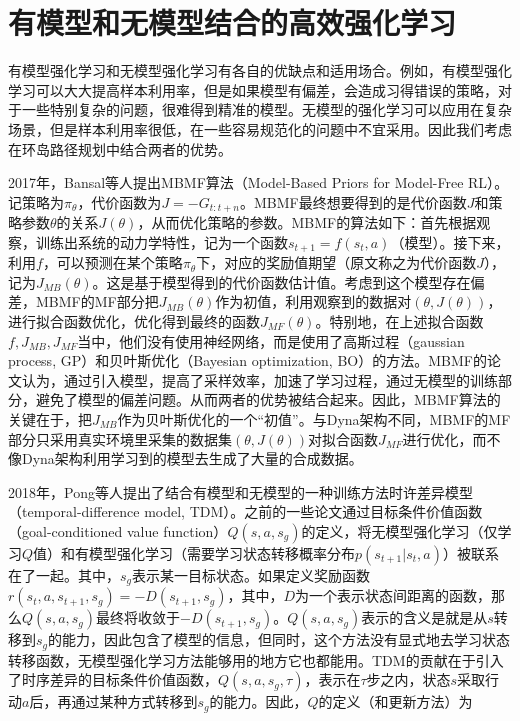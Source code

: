   \section{有模型和无模型结合的高效强化学习}
    有模型强化学习和无模型强化学习有各自的优缺点和适用场合。例如，有模型强化学习可以大大提高样本利用率，但是如果模型有偏差，会造成习得错误的策略，对于一些特别复杂的问题，很难得到精准的模型。无模型的强化学习可以应用在复杂场景，但是样本利用率很低，在一些容易规范化的问题中不宜采用。因此我们考虑在环岛路径规划中结合两者的优势。\par
    2017年，Bansal等人提出MBMF算法（Model-Based Priors for Model-Free RL）\cite{MBMF}。记策略为$\pi_\theta$，代价函数为$J = -G_{t:t+n}$。MBMF最终想要得到的是代价函数$J$和策略参数$\theta$的关系$J(\theta)$，从而优化策略的参数。MBMF的算法如下：首先根据观察，训练出系统的动力学特性，记为一个函数$s_{t+1} = f(s_t, a)$（模型）。接下来，利用$f$，可以预测在某个策略$\pi_\theta$下，对应的奖励值期望（原文称之为代价函数$J$），记为$J_{MB}(\theta)$。这是基于模型得到的代价函数估计值。考虑到这个模型存在偏差，MBMF的MF部分把$J_{MB}(\theta)$作为初值，利用观察到的数据对$(\theta, J(\theta))$，进行拟合函数优化，优化得到最终的函数$J_{MF}(\theta)$。特别地，在上述拟合函数$f, J_{MB}, J_{MF}$当中，他们没有使用神经网络，而是使用了高斯过程\cite{Gaussian_process}（gaussian process, GP）和贝叶斯优化\cite{Bayesian_optimization}（Bayesian optimization, BO）的方法。MBMF的论文认为，通过引入模型，提高了采样效率，加速了学习过程，通过无模型的训练部分，避免了模型的偏差问题。从而两者的优势被结合起来。因此，MBMF算法的关键在于，把$J_{MB}$作为贝叶斯优化的一个``初值''。与Dyna架构\cite{Sutton_book}不同，MBMF的MF部分只采用真实环境里采集的数据集$(\theta, J(\theta))$对拟合函数$J_{MF}$进行优化，而不像Dyna架构利用学习到的模型去生成了大量的合成数据。\par
    2018年，Pong等人提出了结合有模型和无模型的一种训练方法时许差异模型（temporal-difference model, TDM）\cite{TDM}。之前的一些论文通过目标条件价值函数（goal-conditioned value function）$Q(s, a, s_g)$的定义，将无模型强化学习（仅学习$Q$值）和有模型强化学习（需要学习状态转移概率分布$p(s_{t+1}|s_t, a)$）被联系在了一起。其中，$s_g$表示某一目标状态。如果定义奖励函数$r(s_t, a, s_{t+1}, s_g) = -D(s_{t+1}, s_g)$，其中，$D$为一个表示状态间距离的函数，那么$Q(s, a, s_g)$最终将收敛于$-D(s_{t+1}, s_g)$。$Q(s, a, s_g)$表示的含义是就是从$s$转移到$s_g$的能力，因此包含了模型的信息，但同时，这个方法没有显式地去学习状态转移函数，无模型强化学习方法能够用的地方它也都能用。TDM的贡献在于引入了时序差异的目标条件价值函数，$Q(s, a, s_g, \tau)$，表示在$\tau$步之内，状态$s$采取行动$a$后，再通过某种方式转移到$s_g$的能力。因此，$Q$的定义（和更新方法）为
